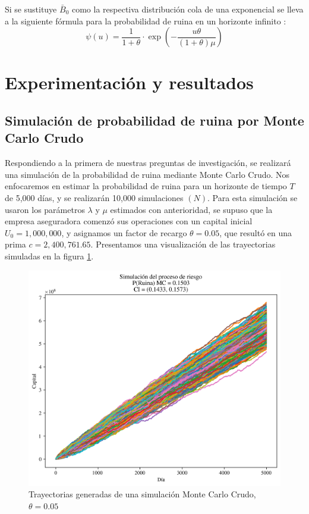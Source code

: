 \documentclass[journal]{IEEEtran}
\begin{document}
            Si se sustituye $\bar{B}_0$ como la respectiva distribución cola de una exponencial se lleva a la siguiente fórmula para la probabilidad de ruina en un horizonte infinito \cite{josafat-santana-2020}:
            \begin{equation}\label{eqn:pollaczeck-prob}
                \psi(u) = \frac{1}{1+\theta} \cdot \exp\left(-\frac{u \theta}{(1+\theta)\mu}\right)
            \end{equation}

    \section{Experimentación y resultados}

        \subsection{Simulación de probabilidad de ruina por Monte Carlo Crudo} \label{sec:monte-carlo}

            Respondiendo a la primera de nuestras preguntas de investigación, se realizará una simulación de la probabilidad de ruina mediante Monte Carlo Crudo. Nos enfocaremos en estimar la probabilidad de ruina para un horizonte de tiempo $T$ de 5,000 días, y se realizarán 10,000 simulaciones $(N)$. Para esta simulación se usaron los parámetros $\lambda$ y $\mu$ estimados con anterioridad, se supuso que la empresa aseguradora comenzó sus operaciones con un capital inicial $U_0 = 1,000,000$, y asignamos un factor de recargo $\theta = 0.05$, que resultó en una prima $c = 2,400,761.65$. Presentamos una visualización de las trayectorias simuladas en la figura \ref{fig:case-study-paths}.
            \begin{figure}[!htbp]
                \centering
                \includegraphics[scale=0.45]{img/ruin_sim_U01000000_T5000_Theta0.05_N10000.png}
                \caption{Trayectorias generadas de una simulación Monte Carlo Crudo, $\theta = 0.05$}
                \label{fig:case-study-paths}
            \end{figure}
            
\end{document}
